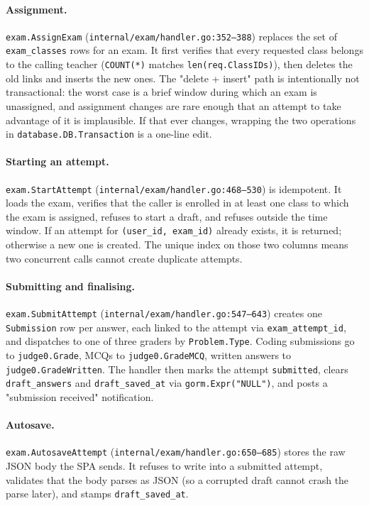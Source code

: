 \paragraph{Assignment.} \texttt{exam.AssignExam} (\texttt{internal/exam/handler.go:352--388}) replaces the set of \texttt{exam\_classes} rows for an exam. It first verifies that every requested class belongs to the calling teacher (\texttt{COUNT(*)} matches \texttt{len(req.ClassIDs)}), then deletes the old links and inserts the new ones. The "delete + insert" path is intentionally not transactional: the worst case is a brief window during which an exam is unassigned, and assignment changes are rare enough that an attempt to take advantage of it is implausible. If that ever changes, wrapping the two operations in \texttt{database.DB.Transaction} is a one-line edit.

\paragraph{Starting an attempt.} \texttt{exam.StartAttempt} (\texttt{internal/exam/handler.go:468--530}) is idempotent. It loads the exam, verifies that the caller is enrolled in at least one class to which the exam is assigned, refuses to start a draft, and refuses outside the time window. If an attempt for \texttt{(user\_id, exam\_id)} already exists, it is returned; otherwise a new one is created. The unique index on those two columns means two concurrent calls cannot create duplicate attempts.

\paragraph{Submitting and finalising.} \texttt{exam.SubmitAttempt} (\texttt{internal/exam/handler.go:547--643}) creates one \texttt{Submission} row per answer, each linked to the attempt via \texttt{exam\_attempt\_id}, and dispatches to one of three graders by \texttt{Problem.Type}. Coding submissions go to \texttt{judge0.Grade}, MCQs to \texttt{judge0.GradeMCQ}, written answers to \texttt{judge0.GradeWritten}. The handler then marks the attempt \texttt{submitted}, clears \texttt{draft\_answers} and \texttt{draft\_saved\_at} via \texttt{gorm.Expr("NULL")}, and posts a "submission received" notification.

\paragraph{Autosave.} \texttt{exam.AutosaveAttempt} (\texttt{internal/exam/handler.go:650--685}) stores the raw JSON body the SPA sends. It refuses to write into a submitted attempt, validates that the body parses as JSON (so a corrupted draft cannot crash the parse later), and stamps \texttt{draft\_saved\_at}.

